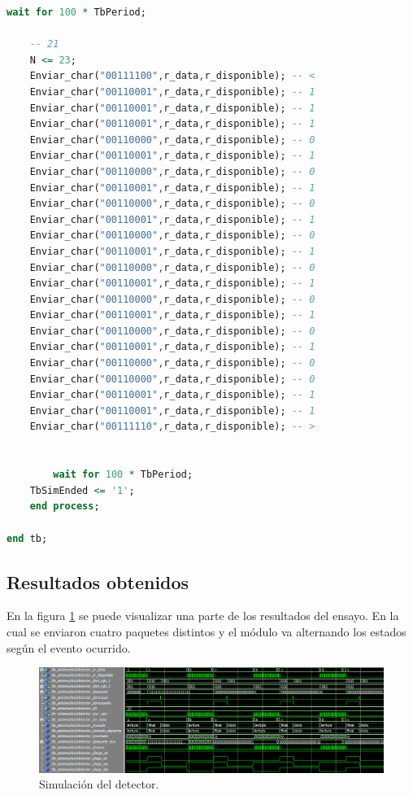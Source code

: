 \begin{lstlisting}[language = vhdl,caption=Testbench del módulo detector,label={lst:test_detector}]
	wait for 100 * TbPeriod;

	-- 21
	N <= 23; 	
	Enviar_char("00111100",r_data,r_disponible); -- < 	
	Enviar_char("00110001",r_data,r_disponible); -- 1 	
	Enviar_char("00110001",r_data,r_disponible); -- 1
 	Enviar_char("00110001",r_data,r_disponible); -- 1 	
	Enviar_char("00110000",r_data,r_disponible); -- 0
	Enviar_char("00110001",r_data,r_disponible); -- 1 	
	Enviar_char("00110000",r_data,r_disponible); -- 0
	Enviar_char("00110001",r_data,r_disponible); -- 1 	
	Enviar_char("00110000",r_data,r_disponible); -- 0
	Enviar_char("00110001",r_data,r_disponible); -- 1 	
	Enviar_char("00110000",r_data,r_disponible); -- 0
	Enviar_char("00110001",r_data,r_disponible); -- 1 	
	Enviar_char("00110000",r_data,r_disponible); -- 0
	Enviar_char("00110001",r_data,r_disponible); -- 1 	
	Enviar_char("00110000",r_data,r_disponible); -- 0
	Enviar_char("00110001",r_data,r_disponible); -- 1 	
	Enviar_char("00110000",r_data,r_disponible); -- 0
	Enviar_char("00110001",r_data,r_disponible); -- 1 	
	Enviar_char("00110000",r_data,r_disponible); -- 0
	Enviar_char("00110000",r_data,r_disponible); -- 0 	
	Enviar_char("00110001",r_data,r_disponible); -- 1
	Enviar_char("00110001",r_data,r_disponible); -- 1 	
	Enviar_char("00111110",r_data,r_disponible); -- >


        wait for 100 * TbPeriod;
	TbSimEnded <= '1';
    end process;
	
end tb;
		\end{lstlisting}
			
	\subsection{Resultados obtenidos}
				
		En la figura \ref{fig:Test_Detector} se puede visualizar una parte de los resultados del ensayo. En la cual se enviaron cuatro paquetes distintos y el módulo va alternando los estados según el evento ocurrido. 
		
		\begin{figure}[h]
		\centering
		\includegraphics[scale=0.5]{./Figures/Test/Detector}
			\caption{Simulación del detector.}
			\label{fig:Test_Detector}
		\end{figure}

